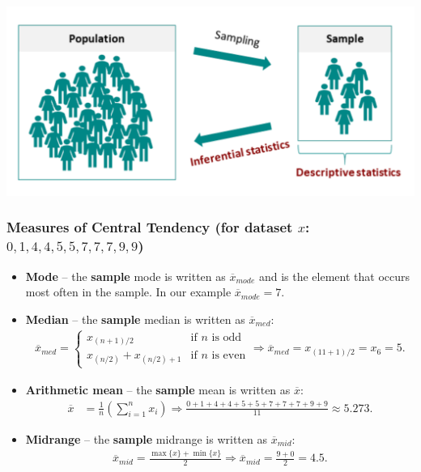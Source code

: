 \documentclass[aspectratio=169]{beamer}
\theoremstyle{principle}
\begin{document}
\begin{frame}
\begin{center}
\includegraphics[scale=0.6]{descriptive_inference.png}
\end{center}

\end{frame}

\begin{frame}
\frametitle{Measures of Central Tendency (for dataset $x$: $0, 1, 4, 4, 5, 5, 7, 7, 7, 9, 9$)}
\begin{itemize}

\item \textbf{Mode} -- the \textbf{sample} mode is written as $\overline{x}_{mode}$ and is the element that occurs most often in the sample.  In our example $\overline{x}_{mode} = 7$.

\item[] \color{white}\textbf{Median} --  the \textbf{sample} median is written as $\overline{x}_{med}$:
\begin{align*}
\overline{x}_{med} = \left\{\begin{array}{ll}
x_{(n+1)/2}&\mbox{if }n\mbox{ is odd}\\
x_{(n/2)} + x_{(n/2)+1}&\mbox{if }n\mbox{ is even}
\end{array}\right.\Longrightarrow \overline{x}_{med} = x_{(11 + 1)/2} = x_6 = 5.
\end{align*}

\item[] \color{white} \textbf{Arithmetic mean} -- the \textbf{sample} mean is written as $\overline{x}$:
\bigskip
\begin{align*}
\overline{x} &= \frac{1}{n}\left(\sum_{i=1}^nx_i\right) \Longrightarrow \frac{0 + 1 + 4 + 4 + 5 + 5 +7 + 7 + 7 + 9 + 9}{11}\approx 5.273.
\end{align*}

\item[] \color{white} \textbf{Midrange} -- the \textbf{sample} midrange is written as $\overline{x}_{mid}$:
\begin{align*}
\overline{x}_{mid} = \frac{\max\{x\} + \min\{x\}}{2}\Longrightarrow\overline{x}_{mid} = \frac{9 + 0}{2} = 4.5.
\end{align*}

\end{itemize}
\end{frame}
\end{document}
